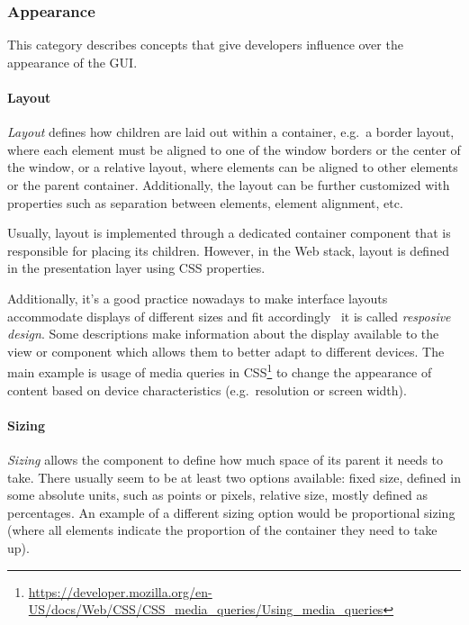 \subsubsection{Appearance}
This category describes concepts that give developers influence over the appearance of the GUI\@.

\paragraph{Layout}
\emph{Layout} defines how children are laid out within a container, e.g.\ a border layout, where each element must be aligned to one of the window borders or the center of the window, or a relative layout, where elements can be aligned to other elements or the parent container.
Additionally, the layout can be further customized with properties such as separation between elements, element alignment, etc.

Usually, layout is implemented through a dedicated container component that is responsible for placing its children.
However, in the Web stack, layout is defined in the presentation layer using CSS properties.

Additionally, it's a good practice nowadays to make interface layouts accommodate displays of different sizes and fit accordingly \textendash\ it is called \emph{resposive design}.
Some descriptions make information about the display available to the view or component which allows them to better adapt to different devices.
The main example is usage of media queries in CSS\footnote{\url{https://developer.mozilla.org/en-US/docs/Web/CSS/CSS_media_queries/Using_media_queries}} to change the appearance of content based on device characteristics (e.g.\ resolution or screen width).

\paragraph{Sizing}
\emph{Sizing} allows the component to define how much space of its parent it needs to take.
There usually seem to be at least two options available: fixed size, defined in some absolute units, such as points or pixels, relative size, mostly defined as percentages.
An example of a different sizing option would be proportional sizing (where all elements indicate the proportion of the container they need to take up).

